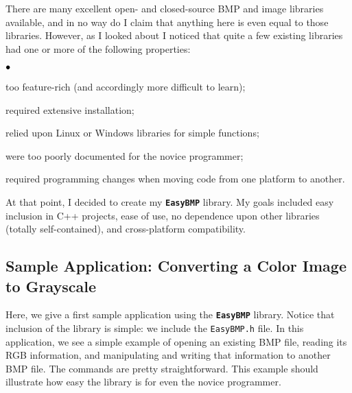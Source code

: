 \documentclass[12pt]{article}
\newcommand{\EasyBMP}{\textbf{\texttt{{\color{DarkBlue}Easy}{\color{DarkRed}BMP}}}}
\begin{document}
There are many excellent open- and closed-source BMP 
and image libraries available, and in no way do I claim that 
anything here is even equal to those libraries. 
However, as I looked about I noticed that quite a few
existing libraries had one or more of the following properties:
\begin{list}{$\bullet\hspace{.125in}$}{}
\item
too feature-rich (and accordingly more difficult to learn);
\item
required extensive installation;
\item
relied upon Linux or Windows libraries for simple functions;
\item
were too poorly documented for the novice programmer;
\item
required programming changes when moving code from one platform to another.
\end{list}
At that point, I decided to create my \EasyBMP{} library. 
My goals included easy inclusion in C++ projects, ease of 
use, no dependence upon other libraries 
(totally self-contained), and cross-platform compatibility.

\subsection{Sample Application: Converting a Color 
Image to Grayscale}
Here, we give a first sample application using the \EasyBMP{} library. 
Notice that inclusion of the library is simple: we include 
the \texttt{EasyBMP.h} file.  In this application, we see a simple 
example of opening an existing BMP file, reading its RGB information, 
and manipulating and writing that information to another BMP file. 
The commands are pretty straightforward. This example should illustrate 
how easy the library is for even the novice programmer.
\end{document}
